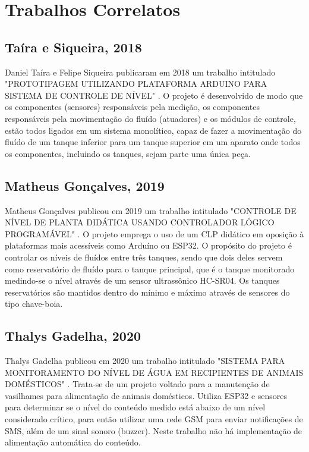 \section{Trabalhos Correlatos}

\subsection{Taíra e Siqueira, 2018}

Daniel Taíra e Felipe Siqueira publicaram em 2018 um trabalho intitulado "PROTOTIPAGEM UTILIZANDO PLATAFORMA ARDUINO PARA SISTEMA DE CONTROLE DE NÍVEL" \cite{tairaprototipagem}. O projeto é desenvolvido de modo que os componentes (sensores) responsáveis pela medição, os componentes responsáveis pela movimentação do fluído (atuadores) e os módulos de controle, estão todos ligados em um sistema monolítico, capaz de fazer a movimentação do fluído de um tanque inferior para um tanque superior em um aparato onde todos os componentes, incluindo os tanques, sejam parte uma única peça.

\subsection{Matheus Gonçalves, 2019}

Matheus Gonçalves publicou em 2019 um trabalho intitulado "CONTROLE DE NÍVEL DE PLANTA DIDÁTICA USANDO CONTROLADOR LÓGICO PROGRAMÁVEL" \cite{gonccalves2019controle}. O projeto emprega o uso de um CLP didático em oposição à plataformas mais acessíveis como Arduíno ou ESP32. O propósito do projeto é controlar os níveis de fluídos entre três tanques, sendo que dois deles servem como reservatório de fluído para o tanque principal, que é o tanque monitorado medindo-se o nível através de um sensor ultrassônico HC-SR04. Os tanques reservatórios são mantidos dentro do mínimo e máximo através de sensores do tipo chave-boia. 

\subsection{Thalys Gadelha, 2020}

Thalys Gadelha publicou em 2020 um trabalho intitulado "SISTEMA PARA MONITORAMENTO DO NÍVEL DE ÁGUA EM RECIPIENTES DE ANIMAIS DOMÉSTICOS" \cite{gadelha2020sistema}. Trata-se de um projeto voltado para a manutenção de vasilhames para alimentação de animais domésticos. Utiliza ESP32 e sensores para determinar se o nível do conteúdo medido está abaixo de um nível considerado crítico, para então utilizar uma rede GSM para enviar notificações de SMS, além de um sinal sonoro (buzzer). Neste trabalho não há implementação de alimentação automática do conteúdo.

